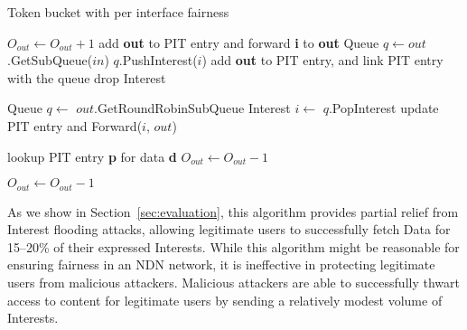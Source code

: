 \begin{algorithm}[h]
\footnotesize
\caption{\small Token bucket with per interface fairness}
\label{alg:queuing}
\begin{algorithmic}[1]
     
\EndFor

\vspace{0.1cm}

     
        \State $O_{out} \leftarrow O_{out} + 1$  
        \State add \textbf{out} to PIT entry and forward \textbf{i} to \textbf{out}
    \Else
        \State Queue $q \leftarrow out$.GetSubQueue($in$)
           \State $q$.PushInterest($i$)
           \State add \textbf{out} to PIT entry, and link PIT entry with the queue
        \Else
           \State drop Interest
        \EndIf
    \EndIf
\EndFunction

\vspace{0.1cm}

\State{} 
    \State Queue $q \leftarrow$ $out$.GetRoundRobinSubQueue 
    \State Interest $i \leftarrow$ $q$.PopInterest
    \State update PIT entry and Forward($i$, $out$)
\EndFunction

\vspace{0.1cm}

   \State lookup PIT entry \textbf{p} for data \textbf{d}
        \State $O_{out} \leftarrow O_{out} - 1$ 
   \EndFor
\EndFunction

\vspace{0.1cm}

        \State $O_{out} \leftarrow O_{out} - 1$ 
   \EndFor
\EndFunction


\end{algorithmic}
\end{algorithm}


As we show in Section~\ref{sec:evaluation}, this algorithm provides partial relief from Interest flooding attacks, allowing legitimate users to successfully fetch Data for 15--20\% of their expressed Interests. While this algorithm might be reasonable for ensuring fairness in an NDN network, it is ineffective in protecting legitimate users from malicious attackers. Malicious attackers are able to successfully thwart access to content for legitimate users by sending a relatively modest volume of Interests.


